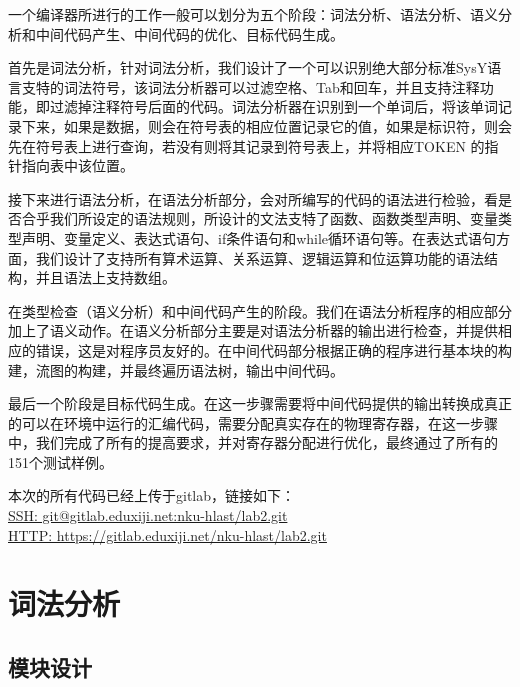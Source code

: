 \documentclass[UTF8,a4paper,10pt]{ctexart}
\begin{document}
一个编译器所进行的工作一般可以划分为五个阶段：词法分析、语法分析、语义分析和中间代码产生、中间代码的优化、目标代码生成。

首先是词法分析，针对词法分析，我们设计了一个可以识别绝大部分标准SysY语言支特的词法符号，该词法分析器可以过滤空格、Tab和回车，并且支持注释功能，即过滤掉注释符号后面的代码。词法分析器在识别到一个单词后，将该单词记录下来，如果是数据，则会在符号表的相应位置记录它的值，如果是标识符，则会先在符号表上进行查询，若没有则将其记录到符号表上，并将相应TOKEN 的指针指向表中该位置。

接下来进行语法分析，在语法分析部分，会对所编写的代码的语法进行检验，看是否合乎我们所设定的语法规则，所设计的文法支特了函数、函数类型声明、变量类型声明、变量定义、表达式语句、if条件语句和while循环语句等。在表达式语句方面，我们设计了支持所有算术运算、关系运算、逻辑运算和位运算功能的语法结构，并且语法上支持数组。

在类型检查（语义分析）和中间代码产生的阶段。我们在语法分析程序的相应部分加上了语义动作。在语义分析部分主要是对语法分析器的输出进行检查，并提供相应的错误，这是对程序员友好的。在中间代码部分根据正确的程序进行基本块的构建，流图的构建，并最终遍历语法树，输出中间代码。

最后一个阶段是目标代码生成。在这一步骤需要将中间代码提供的输出转换成真正的可以在环境中运行的汇编代码，需要分配真实存在的物理寄存器，在这一步骤中，我们完成了所有的提高要求，并对寄存器分配进行优化，最终通过了所有的151个测试样例。

本次的所有代码已经上传于gitlab，链接如下：\\
\href{git@gitlab.eduxiji.net:nku-hlast/lab2.git}{SSH: git@gitlab.eduxiji.net:nku-hlast/lab2.git}\\
\href{https://gitlab.eduxiji.net/nku-hlast/lab2.git}{HTTP:  https://gitlab.eduxiji.net/nku-hlast/lab2.git}










\newpage

\section{词法分析}
\subsection{模块设计}
\end{document}
